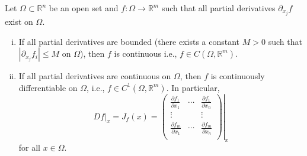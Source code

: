 \documentclass[10pt]{article}
\newcommand{\R}{\mathbb{R}}
\begin{document}
  \begin{theorem}
    Let $\Omega \subset \R^{n}$ be an open set and $f:\Omega \to \R^{m}$ such that all partial derivatives $\partial_{x_{j}}f$ exist on $\Omega$.
    \begin{enumerate}[(i)]
      \item If all partial derivatives are bounded (there exists a constant $M > 0$ such that $|\partial_{x_{j}}f_{i}| \leq M$ on $\Omega$), then $f$ is continuous i.e., $f \in C(\Omega, \R^{m})$.
      \item If all partial derivatives are continuous on $\Omega$, then $f$ is continuously differentiable on $\Omega$, i.e., $f \in C^{1}(\Omega, \R^{m})$. In particular,
      \[
        Df|_{x} = J_{f}(x) = \left.\begin{pmatrix}
          \frac{\partial f_{1}}{\partial x_{1}} & \cdots & \frac{\partial f_{1}}{\partial x_{n}} \\
          \vdots & & \vdots \\
          \frac{\partial f_{m}}{\partial x_{1}} & \cdots & \frac{\partial f_{m}}{\partial x_{n}} \\
        \end{pmatrix}\right|_{x}  
      \]
      for all $x \in \Omega$.
    \end{enumerate}
  \end{theorem}
\end{document}

